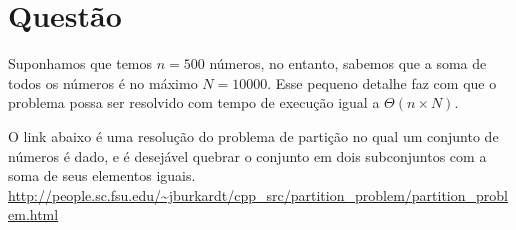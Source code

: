 \documentclass[a4paper,12pt]{article}
\begin{document}
\section{Questão}


Suponhamos que temos $n = 500$ números, no entanto, sabemos que a soma de todos os números é no máximo $N = 10000$. Esse pequeno detalhe faz com que o problema possa ser resolvido com tempo de execução igual a $\Theta(n\times N)$.

O link abaixo é uma resolução do problema de partição no qual um conjunto de números é dado, e é desejável quebrar o conjunto em dois subconjuntos com a soma de seus elementos iguais.\\
\url{http://people.sc.fsu.edu/~jburkardt/cpp_src/partition_problem/partition_problem.html}
\end{document}
